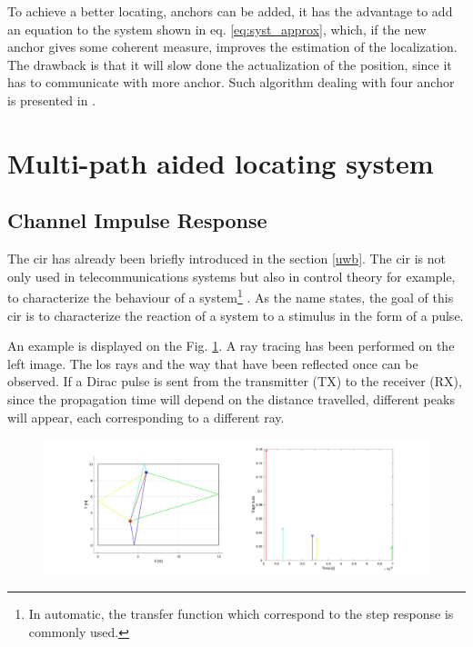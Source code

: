 To achieve a better locating, anchors can be added, it has the advantage to add an equation to the system shown in eq. \ref{eq:syst_approx}, which, if the new anchor gives some coherent measure, improves the estimation of the localization. The drawback is that it will slow done the actualization of the position, since it has to communicate with more anchor. Such algorithm dealing with four anchor is presented in \cite{guyard2019navigation}.

\section{Multi-path aided locating system}

\subsection{Channel Impulse Response}
\label{mp_cir}

The \gls{cir} has already been briefly introduced in the section \ref{uwb}. The \gls{cir} is not only used in telecommunications systems but also in control theory for example, to characterize the behaviour of a system\footnote{In automatic, the transfer function which correspond to the step response is commonly used.} \cite{garonne2019course}. As the name states, the goal of this \gls{cir} is to characterize the reaction of a system to a stimulus in the form of a pulse.
\vspace{2mm}

An example is displayed on the Fig. \ref{fig:cir_ex1}. A ray tracing has been performed on the left image. The \gls{los} rays and the way that have been reflected once can be observed. If a Dirac pulse is sent from the transmitter (TX) to the receiver (RX), since the propagation time will depend on the distance travelled, different peaks will appear, each corresponding to a different ray.

\begin{figure}[H]
	\centering
	\includegraphics[width=.95\linewidth]{Images/Anchor-mpc.jpg}
	\caption{}
	\label{fig:cir_ex1}
\end{figure}

